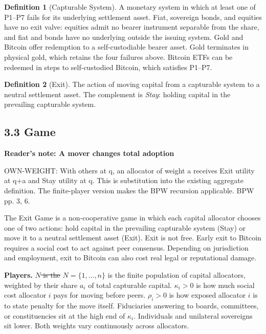 \documentclass[12pt]{article}
\theoremstyle{definition}
\newtheorem{definition}{Definition}
\theoremstyle{remark}
\providecommand{\DIFaddtex}[1]{{\color{AddedText}#1}}
\providecommand{\DIFdeltex}[1]{{\color{DeletedText}\sout{#1}}}
\providecommand{\DIFaddbegin}{}
\providecommand{\DIFaddend}{}
\providecommand{\DIFdelbegin}{}
\providecommand{\DIFdelend}{}
\newcommand{\ReviewNote}[2]{\par\begin{mdframed}[backgroundcolor=blue!3,linecolor=NoteText,linewidth=0.6pt]\color{NoteText}\small\textbf{Reader's note: #1}\par #2\end{mdframed}\par}
\providecommand{\DIFadd}[1]{\texorpdfstring{\DIFaddtex{#1}}{#1}} %
\providecommand{\DIFdel}[1]{\texorpdfstring{\DIFdeltex{#1}}{}} %
\begin{document}
\begin{definition}[Capturable System]
A monetary system in which at least one of P1--P7 fails for its
underlying settlement asset. Fiat, sovereign bonds, and equities
have no exit valve: equities admit no bearer instrument separable
from the share, and fiat and bonds have no underlying outside the
issuing system. Gold and Bitcoin offer redemption to a
self-custodiable bearer asset. Gold terminates in physical gold,
which retains the four failures above. Bitcoin ETFs can be
redeemed in steps to self-custodied Bitcoin, which satisfies P1--P7.
\end{definition}

\begin{definition}[Exit]
The action of moving capital from a capturable system to a neutral
settlement asset. The complement is \emph{Stay}: holding
capital in the prevailing capturable system.
\end{definition}

\subsection{3.3 Game}


\ReviewNote{A mover changes total adoption}{OWN-WEIGHT: With others at q, an allocator of weight a receives Exit utility at q+a and Stay utility at q. This is substitution into the existing aggregate definition. The finite-player version makes the BPW recursion applicable. BPW pp. 3, 6.}
The Exit Game is a non-cooperative game in which each capital allocator chooses one of two actions: hold capital in the prevailing capturable system (Stay) or move it to a neutral settlement asset (Exit). Exit is not free. Early exit to Bitcoin requires a social cost to act against peer consensus. Depending on jurisdiction and employment, exit to Bitcoin can also cost real legal or reputational damage.

\smallskip
\noindent\textbf{Players.} \DIFdelbegin \DIFdel{$N$ is the }\DIFdelend \DIFaddbegin \DIFadd{$N=\{1,\ldots,n\}$ is the finite }\DIFaddend population of capital allocators, weighted by their share $a_i$ of total capturable capital. $\kappa_i > 0$ is how much social cost allocator $i$ pays for moving before peers. $\rho_i > 0$ is how exposed allocator $i$ is to state penalty for the move itself. Fiduciaries answering to boards, committees, or constituencies sit at the high end of $\kappa_i$. Individuals and unilateral sovereigns sit lower. Both weights vary continuously across allocators.
\end{document}
